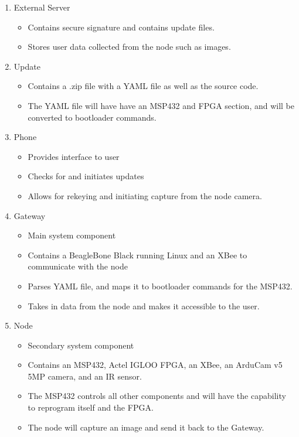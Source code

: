 \documentclass[11pt]{article}
\begin{document}
\begin{enumerate}
\item External Server
\begin{itemize}
\item Contains secure signature and contains update files.
\item Stores user data collected from the node such as images. 
\end{itemize}

\item Update
\begin{itemize}
\item Contains a .zip file with a YAML file as well as the source code.
\item The YAML file will have have an MSP432 and FPGA section, and will be converted to bootloader commands. 
\end{itemize}

\item Phone
\begin{itemize}
\item Provides interface to user
\item Checks for and initiates updates
\item Allows for rekeying and initiating capture from the node camera.
\end{itemize}

\item Gateway
\begin{itemize}
\item Main system component
\item Contains a BeagleBone Black running Linux and an XBee to communicate with the node
\item Parses YAML file, and maps it to bootloader commands for the MSP432. 
\item Takes in data from the node and makes it accessible to the user. 
\end{itemize}

\item Node
\begin{itemize}
\item Secondary system component
\item Contains an MSP432, Actel IGLOO FPGA, an XBee, an ArduCam v5 5MP camera, and an IR sensor. 
\item The MSP432 controls all other components and will have the capability to reprogram itself and the FPGA.
\item The node will capture an image and send it back to the Gateway. 
\end{itemize}

\end{enumerate}
\end{document}
